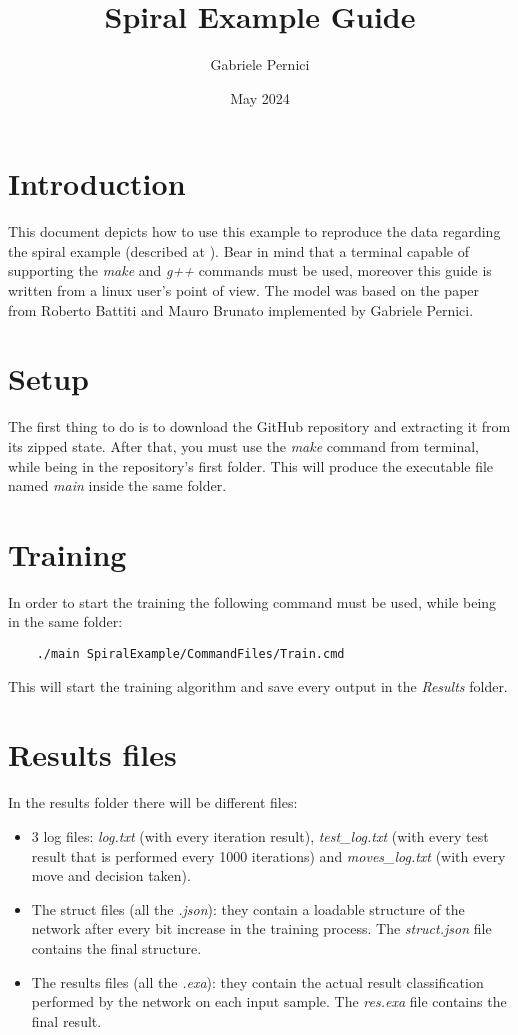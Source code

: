 \documentclass{article}
\title{Spiral Example Guide}
\author{Gabriele Pernici}
\date{May 2024}
\begin{document}
	
\maketitle

\tableofcontents

\section{Introduction}
This document depicts how to use this example to reproduce the data regarding the spiral example (described at \cite{Lang2018LearningTT}). Bear in mind that a terminal capable of supporting the \textit{make} and \textit{g++} commands must be used, moreover this guide is written from a linux user's point of view.
The model was based on the paper from Roberto Battiti and Mauro Brunato \cite{7436772} implemented by Gabriele Pernici.

\section{Setup}
The first thing to do is to download the GitHub repository and extracting it from its zipped state. After that, you must use the \textit{make} command from terminal, while being in the repository's first folder. This will produce the executable file named \textit{main} inside the same folder.

\section{Training} \label{sec:train}
In order to start the training the following command must be used, while being in the same folder:

\begin{verbatim}
	./main SpiralExample/CommandFiles/Train.cmd
\end{verbatim}

This will start the training algorithm and save every output in the \textit{Results} folder.

\section{Results files}
In the results folder there will be different files: 
\begin{itemize}
	\item 3 log files: \textit{log.txt} (with every iteration result), \textit{test\_log.txt} (with every test result that is performed every 1000 iterations) and \textit{moves\_log.txt} (with every move and decision taken).
	
	\item The struct files (all the \textit{.json}): they contain a loadable structure of the network after every bit increase in the training process. The \textit{struct.json} file contains the final structure.
	
	\item The results files (all the \textit{.exa}): they contain the actual result classification performed by the network on each input sample. The \textit{res.exa} file contains the final result.
\end{itemize}
\end{document}
